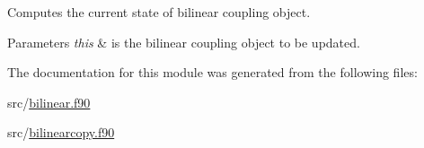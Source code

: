 Computes the current state of bilinear coupling object. 


\begin{DoxyParams}{Parameters}
{\em this} & is the bilinear coupling object to be updated. \\
\hline
\end{DoxyParams}


The documentation for this module was generated from the following files\+:\begin{DoxyCompactItemize}
\item 
src/\hyperlink{bilinear_8f90}{bilinear.\+f90}\item 
src/\hyperlink{bilinearcopy_8f90}{bilinearcopy.\+f90}\end{DoxyCompactItemize}
